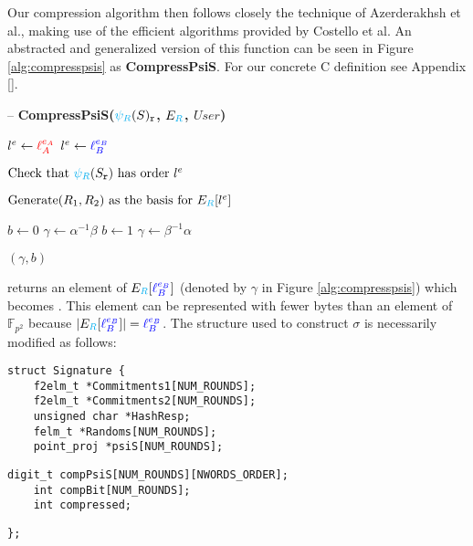 Our compression algorithm then follows closely the technique of Azerderakhsh et al., making use of the efficient algorithms provided by Costello et al. An abstracted and generalized version of this function can be seen in Figure \ref{alg:compresspsis} as \textbf{CompressPsiS}. For our concrete C definition see Appendix \ref{}.

\begin{algorithm}
\caption{-- \textbf{CompressPsiS($\textcolor{cyan}{\psi_R}(S)_{\texttt{r}}$, $E_{\textcolor{cyan}{R}}$, $User$)}}
\label{alg:compresspsis}
\begin{algorithmic}[1]
	\State $l^e \gets \textcolor{red}{\ell_{A}^{e_A}}$
\EndIf
{}
	\State $l^e \gets \textcolor{blue}{\ell_{B}^{e_B}}$
\EndIf

\State $\text{Check that } \textcolor{cyan}{\psi_R}(S_{\texttt{r}}) \text{ has order } l^e$

\State $\text{Generate} (R_{1}, R_{2}) \text{ as the basis for } E_{\textcolor{cyan}{R}}[l^e]$

\State {}

	\State $b \gets 0$
	\State $\gamma \gets \alpha^{-1}\beta$
\Else
	\State $b \gets 1$
	\State $\gamma \gets \beta^{-1}\alpha$
\EndIf

\State \Return $(\gamma, b)$
\end{algorithmic}
\end{algorithm}

 returns an element of $E_{\textcolor{cyan}{R}}[\textcolor{blue}{\ell_{B}^{e_B}}]$ (denoted by $\gamma$ in Figure \ref{alg:compresspsis}) which becomes . This element can be represented with fewer bytes than an element of $\mathbb{F}_{p^2}$ because $\vert E_{\textcolor{cyan}{R}}[\textcolor{blue}{\ell_{B}^{e_B}}] \vert = \textcolor{blue}{\ell_{B}^{e_B}}$. The  structure used to construct $\sigma$ is necessarily modified as follows:

\begin{lstlisting}
struct Signature {
	f2elm_t *Commitments1[NUM_ROUNDS];
	f2elm_t *Commitments2[NUM_ROUNDS];
	unsigned char *HashResp;
	felm_t *Randoms[NUM_ROUNDS];
	point_proj *psiS[NUM_ROUNDS];
	\end{lstlisting}
\vspace{-0.75\baselineskip}
\begin{lstlisting}[backgroundcolor=\color{light-green}, firstnumber=7]
	digit_t compPsiS[NUM_ROUNDS][NWORDS_ORDER];
	int compBit[NUM_ROUNDS];
	int compressed;
\end{lstlisting}
\vspace{-0.75\baselineskip}
\begin{lstlisting}[firstnumber=10]
};
\end{lstlisting}
\vspace{15px}

